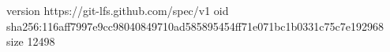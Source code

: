 version https://git-lfs.github.com/spec/v1
oid sha256:116aff7997e9cc98040849710ad585895454ff71e071bc1b0331c75c7e192968
size 12498
